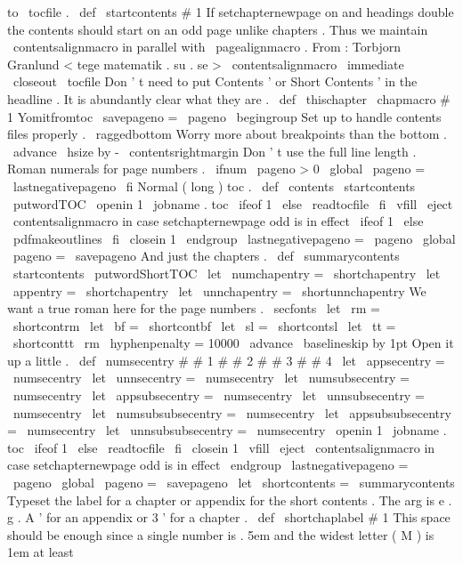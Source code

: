 {to
\
tocfile
.
%
\
def
\
startcontents
#
1
{
%
%
If
setchapternewpage
on
and
headings
double
the
contents
should
%
start
on
an
odd
page
unlike
chapters
.
Thus
we
maintain
%
\
contentsalignmacro
in
parallel
with
\
pagealignmacro
.
%
From
:
Torbjorn
Granlund
<
tege
matematik
.
su
.
se
>
\
contentsalignmacro
\
immediate
\
closeout
\
tocfile
%
%
Don
'
t
need
to
put
Contents
'
or
Short
Contents
'
in
the
headline
.
%
It
is
abundantly
clear
what
they
are
.
\
def
\
thischapter
{
}
%
\
chapmacro
{
#
1
}
{
Yomitfromtoc
}
{
}
%
%
\
savepageno
=
\
pageno
\
begingroup
%
Set
up
to
handle
contents
files
properly
.
\
raggedbottom
%
Worry
more
about
breakpoints
than
the
bottom
.
\
advance
\
hsize
by
-
\
contentsrightmargin
%
Don
'
t
use
the
full
line
length
.
%
%
Roman
numerals
for
page
numbers
.
\
ifnum
\
pageno
>
0
\
global
\
pageno
=
\
lastnegativepageno
\
fi
}
%
Normal
(
long
)
toc
.
\
def
\
contents
{
%
\
startcontents
{
\
putwordTOC
}
%
\
openin
1
\
jobname
.
toc
\
ifeof
1
\
else
\
readtocfile
\
fi
\
vfill
\
eject
\
contentsalignmacro
%
in
case
setchapternewpage
odd
is
in
effect
\
ifeof
1
\
else
\
pdfmakeoutlines
\
fi
\
closein
1
\
endgroup
\
lastnegativepageno
=
\
pageno
\
global
\
pageno
=
\
savepageno
}
%
And
just
the
chapters
.
\
def
\
summarycontents
{
%
\
startcontents
{
\
putwordShortTOC
}
%
%
\
let
\
numchapentry
=
\
shortchapentry
\
let
\
appentry
=
\
shortchapentry
\
let
\
unnchapentry
=
\
shortunnchapentry
%
We
want
a
true
roman
here
for
the
page
numbers
.
\
secfonts
\
let
\
rm
=
\
shortcontrm
\
let
\
bf
=
\
shortcontbf
\
let
\
sl
=
\
shortcontsl
\
let
\
tt
=
\
shortconttt
\
rm
\
hyphenpenalty
=
10000
\
advance
\
baselineskip
by
1pt
%
Open
it
up
a
little
.
\
def
\
numsecentry
#
#
1
#
#
2
#
#
3
#
#
4
{
}
\
let
\
appsecentry
=
\
numsecentry
\
let
\
unnsecentry
=
\
numsecentry
\
let
\
numsubsecentry
=
\
numsecentry
\
let
\
appsubsecentry
=
\
numsecentry
\
let
\
unnsubsecentry
=
\
numsecentry
\
let
\
numsubsubsecentry
=
\
numsecentry
\
let
\
appsubsubsecentry
=
\
numsecentry
\
let
\
unnsubsubsecentry
=
\
numsecentry
\
openin
1
\
jobname
.
toc
\
ifeof
1
\
else
\
readtocfile
\
fi
\
closein
1
\
vfill
\
eject
\
contentsalignmacro
%
in
case
setchapternewpage
odd
is
in
effect
\
endgroup
\
lastnegativepageno
=
\
pageno
\
global
\
pageno
=
\
savepageno
}
\
let
\
shortcontents
=
\
summarycontents
%
Typeset
the
label
for
a
chapter
or
appendix
for
the
short
contents
.
%
The
arg
is
e
.
g
.
A
'
for
an
appendix
or
3
'
for
a
chapter
.
%
\
def
\
shortchaplabel
#
1
{
%
%
This
space
should
be
enough
since
a
single
number
is
.
5em
and
the
%
widest
letter
(
M
)
is
1em
at
least
}}
